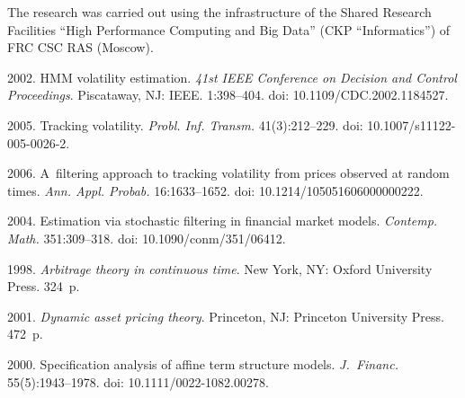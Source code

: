




\vspace*{-18pt}

\Ack
\noindent
The research was carried out using the infrastructure of the Shared Research Facilities 
``High Performance Computing and Big Data'' (CKP ``Informatics'') of FRC CSC RAS (Moscow).
  

\vspace*{6pt}

  \begin{multicols}{2}

\renewcommand{\bibname}{\protect\rmfamily References}

{\small\frenchspacing
 {%
 \begin{thebibliography}{99} 
 2002. 
HMM volatility estimation. \textit{41st IEEE Conference on Decision and Control Proceedings}. Piscataway, NJ: IEEE.
1:398--404. doi: 10.1109/CDC.2002.1184527.

 2005. Tracking volatility.
\textit{Probl. Inf. Transm.} 41(3):212--229. doi: 10.1007/s11122-005-0026-2.

 2006. A~filtering approach to tracking volatility from prices observed at random times. 
\textit{Ann. Appl. Probab.} 16:1633--1652. doi: 10.1214/105051606000000222.

 2004. Estimation via stochastic filtering in financial market models. \textit{Contemp. Math.} 351:309--318. 
doi: 10.1090/conm/351/06412.

 1998. \textit{Arbitrage theory in continuous time}. New York, NY: Oxford University Press. 324~p.

 2001. \textit{Dynamic asset pricing theory}. Princeton, NJ: Princeton University Press. 472~p.

 2000. Specification analysis of affine term structure models.  \textit{J.~Financ.} 55(5):1943--1978.
doi: 10.1111/0022-1082.00278.


\end{thebibliography}}}
\end{multicols}
